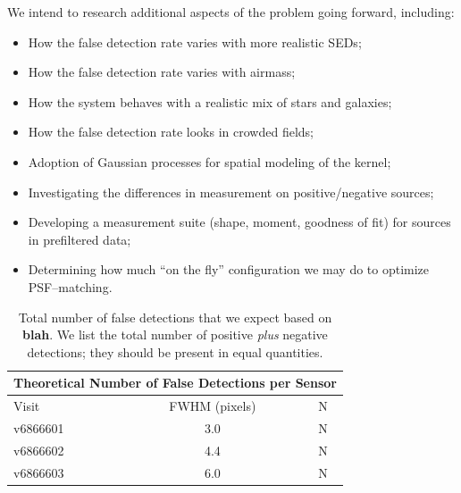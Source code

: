 \documentclass[prd, nofootinbib, floatfix, 11pt,tightenlines,times]{article}
\begin{document}
We intend to research additional aspects of the problem going forward,
including:
\begin{itemize}
\item How the false detection rate varies with more realistic SEDs;
\item How the false detection rate varies with airmass;
\item How the system behaves with a realistic mix of stars and galaxies;
\item How the false detection rate looks in crowded fields;
\item Adoption of Gaussian processes for spatial modeling of the kernel;
\item Investigating the differences in measurement on positive/negative sources;
\item Developing a measurement suite (shape, moment, goodness of fit) for sources in prefiltered data;
\item Determining how much ``on the fly'' configuration we may do to optimize PSF--matching.
\end{itemize}

\clearpage



\clearpage

\begin{table}
\centering
\begin{tabular}{lcc}
\hline
\multicolumn{3}{|c|}{Theoretical Number of False Detections per Sensor} \\
\hline
Visit    & FWHM (pixels) & N\\
\hline
v6866601 & 3.0 & N \\
v6866602 & 4.4 & N \\
v6866603 & 6.0 & N \\
\end{tabular}
\caption{Total number of false detections that we expect based on
  {\bf blah}.  We list the total number of positive {\it plus} negative detections;
  they should be present in equal quantities. \label{tab-fp}
}
\end{table}
\end{document}
